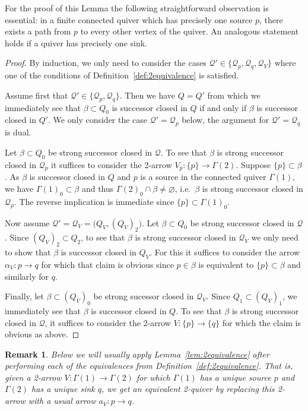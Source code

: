 \documentclass{amsart}
\newtheorem{remark}[theorem]{Remark}
\numberwithin{equation}{section}
\newcommand{\cQ}{\mathcal{Q}}
\begin{document}
For the proof of this Lemma the following straightforward observation is essential: in a finite connected quiver which has precisely one source $p$, there exists a path from $p$ to every other vertex of the quiver.
An analogous statement holds if a quiver has precisely one sink. 
\begin{proof}
  By induction, we only need to consider the cases $\cQ'\in\{\cQ_p,\cQ_q,\cQ_V\}$ where one of the conditions of Definition~\ref{def:2equivalence} is satisfied.

  Assume first that $\cQ'\in\{\cQ_p,\cQ_q\}$.
  Then we have $Q=Q'$ from which we immediately see that $\beta\subset Q_0$ is successor closed in $Q$ if and only if $\beta$ is successor closed in $Q'$.
  We only consider the case $\cQ'=\cQ_p$ below, the argument for $\cQ'=\cQ_q$ is dual.

  Let $\beta\subset Q_0$ be strong successor closed in $\cQ$.
  To see that $\beta$ is strong successor closed in $\cQ_p$ it suffices to consider the 2-arrow $V_p:\{p\}\to\Gamma(2)$.
  Suppose $\{p\}\subset\beta$.
  As $\beta$ is successor closed in $Q$ and $p$ is a source in the connected quiver $\Gamma(1)$, we have $\Gamma(1)_0\subset\beta$ and thus $\Gamma(2)_0\cap\beta\ne\varnothing$, i.e.\ $\beta$ is strong successor closed in $\cQ_p$.
  The reverse implication is immediate since $\{p\}\subset\Gamma(1)_0$.

  Now assume $\cQ'=\cQ_V=\big(Q_V,(Q_V)_2\big)$. 
  Let $\beta\subset Q_0$ be strong successor closed in $\cQ$.
  Since $(Q_V)_2\subset Q_2$, to see that $\beta$ is strong successor closed in $\cQ_V$ we only need to show that $\beta$ is successor closed in $Q_V$.  
  For this it suffices to consider the arrow $\alpha_V:p\to q$ for which that claim is obvious since $p\in\beta$ is equivalent to $\{p\}\subset\beta$ and similarly for $q$.

  Finally, let $\beta\subset(Q_V)_0$ be strong sucessor closed in $\cQ_V$.
  Since $Q_1\subset(Q_V)_1$, we immediately see that $\beta$ is successor closed in $Q$.
  To see that $\beta$ is strong successor closed in $\cQ$, it suffices to consider the 2-arrow $V:\{p\}\to\{q\}$ for which the claim is obvious as above.
\end{proof}

\begin{remark}
  Below we will usually apply Lemma~\ref{lem:2equivalence} after performing each of the equivalences from Definition~\ref{def:2equivalence}.
  That is, given a 2-arrow $V:\Gamma(1)\to\Gamma(2)$ for which $\Gamma(1)$ has a unique source $p$ and $\Gamma(2)$ has a unique sink $q$, we get an equivalent 2-quiver by replacing this 2-arrow with a usual arrow $a_V:p\to q$.
\end{remark}
\end{document}
